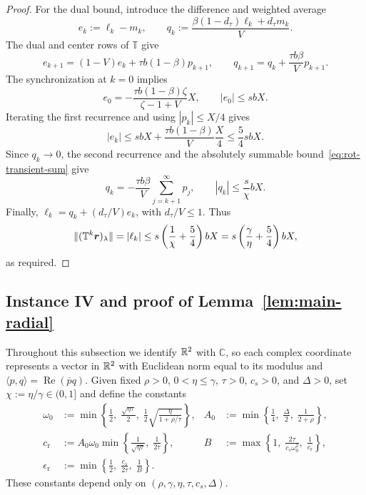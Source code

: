 \begin{proof}
For the dual bound, introduce the difference and weighted average
\[
e_k:=\ell_k-m_k,
\qquad q_k:=\frac{\beta(1-d_\tau)\ell_k+d_\tau m_k}{V}.
\]
The dual and center rows of \(\mathbb T\) give
\[
e_{k+1}=(1-V)e_k+\tau b(1-\beta)p_{k+1},
\qquad q_{k+1}=q_k+\frac{\tau b\beta}{V}p_{k+1}.
\]
The synchronization at \(k=0\) implies
\[
e_0=-\frac{\tau b(1-\beta)\zeta}{\zeta-1+V}X,
\qquad |e_0|\le sbX.
\]
Iterating the first recurrence and using \(|p_k|\le X/4\) gives
\[
|e_k|\le sbX+\frac{\tau b(1-\beta)}V\frac X4\le\frac54sbX.
\]
Since \(q_k\to0\), the second recurrence and the absolutely summable
bound~\eqref{eq:rot-transient-sum} give
\[
q_k=-\frac{\tau b\beta}V\sum_{j=k+1}^{\infty}p_j,
\qquad |q_k|\le\frac{s}{\chi}bX.
\]
Finally, \(\ell_k=q_k+(d_\tau/V)e_k\), with \(d_\tau/V\le1\).
Thus
\[
\|(\mathbb T^k\bm{r})_\lambda\|=|\ell_k|
\le s\left(\frac1\chi+\frac54\right)bX
=s\left(\frac\gamma\eta+\frac54\right)bX,
\]
as required.
\end{proof}

\subsection{Instance IV and proof of Lemma~\ref{lem:main-radial}}
\label{app:radial}

Throughout this subsection we identify \(\mathbb{R}^2\) with \(\mathbb C\), so each
complex coordinate represents a vector in \(\mathbb{R}^2\) with Euclidean norm equal to
its modulus and \(\langle p,q\rangle=\operatorname{Re}(\overline p q)\).
Given fixed \(\rho>0\), \(0<\eta\le\gamma\), \(\tau>0\), \(c_s>0\), and
\(\Delta>0\), set \(\chi:=\eta/\gamma\in(0,1]\) and define the constants
\begin{equation}
\begin{aligned}
\omega_0&:=\min\left\{
  \frac12,\;
  \frac{\sqrt{\eta\tau}}{2},\;
  \frac12\sqrt{\frac{\eta}{1+\rho/\tau}}\right\},
& A_0&:=\min\left\{\frac14,\;\frac{\Delta}{2},\;\frac{1}{2+\rho}\right\},\\
c_\mathrm{r}&:=A_0\omega_0
  \min\left\{\frac{1}{\sqrt{\eta\tau}},\;\frac{1}{2\tau}\right\},
& B&:=\max\left\{1,\;\frac{2\tau}{c_s\omega_0^2},\;\frac{1}{c_\mathrm{r}}\right\},\\
\epsilon_\mathrm{r}&:=\min\left\{\frac12,\;\frac{c_s}{2\tau},\;\frac{1}{B}\right\}.
\end{aligned}
\label{eq:radial-fixed-constants}
\end{equation}
These constants depend only on \((\rho,\gamma,\eta,\tau,c_s,\Delta)\).

